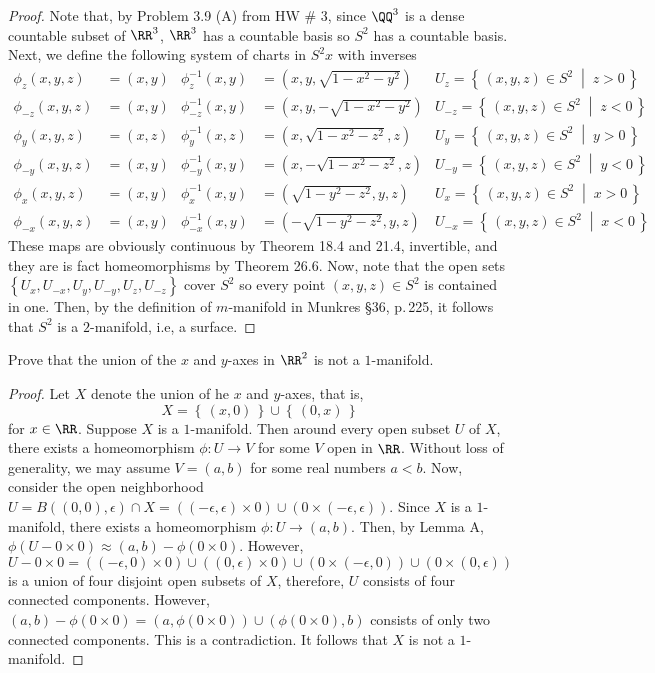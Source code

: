 \begin{proof}
Note that, by Problem 3.9 (A) from HW \# 3, since $\QQ^3$ is a dense
countable subset of $\RR^3$, $\RR^3$ has a countable basis so $S^2$ has a
countable basis. Next, we define the following system of charts in $S^2x$
with inverses
\begin{align*}
\phi_z(x,y,z)&=(x,y)&
\phi_z^{-1}(x,y)&=\left(x,y,\sqrt{1-x^2-y^2}\right)&
U_z=\left\{\,(x,y,z)\in S^2\;\middle|\;z>0\,\right\}\\
\phi_{-z}(x,y,z)&=(x,y)&
\phi_{-z}^{-1}(x,y)&=\left(x,y,-\sqrt{1-x^2-y^2}\right)&
U_{-z}=\left\{\,(x,y,z)\in S^2\;\middle|\;z<0\,\right\}\\
\phi_{y}(x,y,z)&=(x,z)&
\phi_{y}^{-1}(x,z)&=\left(x,\sqrt{1-x^2-z^2},z\right)&
U_{y}=\left\{\,(x,y,z)\in S^2\;\middle|\;y>0\,\right\}\\
\phi_{-y}(x,y,z)&=(x,y)&
\phi_{-y}^{-1}(x,y)&=\left(x,-\sqrt{1-x^2-z^2},z\right)&
U_{-y}=\left\{\,(x,y,z)\in S^2\;\middle|\;y<0\,\right\}\\
\phi_x(x,y,z)&=(x,y)&
\phi_x^{-1}(x,y)&=\left(\sqrt{1-y^2-z^2},y,z\right)&
U_x=\left\{\,(x,y,z)\in S^2\;\middle|\;x>0\,\right\}\\
\phi_{-x}(x,y,z)&=(x,y)&
\phi_{-x}^{-1}(x,y)&=\left(-\sqrt{1-y^2-z^2},y,z\right)&
U_{-x}=\left\{\,(x,y,z)\in S^2\;\middle|\;x<0\,\right\}
\end{align*}
These maps are obviously continuous by Theorem 18.4 and 21.4, invertible,
and they are is fact homeomorphisms by Theorem 26.6. Now, note
that the open sets $\left\{U_x,U_{-x},U_y,U_{-y},U_z,U_{-z}\right\}$ cover
$S^2$ so every point $(x,y,z)\in S^2$ is contained in one. Then, by the
definition of $m$-manifold in Munkres \S 36, p.\,225, it follows that $S^2$
is a $2$-manifold, i.e, a surface.
\end{proof}
\newpage
\begin{problem}[(D)]
Prove that the union of the $x$ and $y$-axes in $\RR^2$ is not a
$1$-manifold.
\end{problem}
\begin{proof}
Let $X$ denote the union of he $x$ and $y$-axes, that is,
\[
X=\left\{\,(x,0)\,\right\}\cup\left\{\,(0,x)\,\right\}
\]
for $x\in\RR$. Suppose $X$ is a $1$-manifold. Then around every
open subset $U$ of $X$, there exists a homeomorphism
$\phi\colon U\to V$ for some $V$ open in $\RR$. Without loss of
generality, we may assume $V=(a,b)$ for some real numbers
$a<b$. Now, consider the open neighborhood
$U=B((0,0),\epsilon)\cap X=((-\epsilon,\epsilon)\times
0)\cup(0\times(-\epsilon,\epsilon))$. Since $X$ is a
$1$-manifold, there exists a homeomorphism $\phi\colon U\to
(a,b)$. Then, by Lemma A, $\phi(U-0\times 0)\approx
(a,b)-\phi(0\times 0)$. However,
\[
U-0\times 0=((-\epsilon,0)\times 0)\cup((0,\epsilon)\times 0)\cup(0\times(-\epsilon,0))\cup(0\times(0,\epsilon))
\]
is a union of four disjoint open subsets of $X$, therefore, $U$
consists of four connected components. However,
$(a,b)-\phi(0\times 0)=(a,\phi(0\times 0))\cup(\phi(0\times
0),b)$ consists of only two connected components. This is a
contradiction. It follows that $X$ is not a $1$-manifold.
\end{proof}

